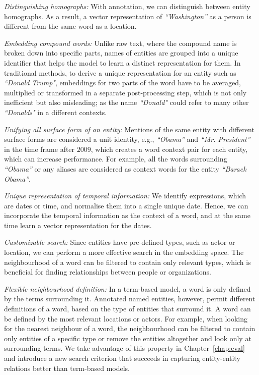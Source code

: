\begin{compactitem}
\item \emph{Distinguishing homographs:} With annotation, we can distinguish between entity homographs. As a result, a vector representation of \emph{``Washington''} as a person is different from the same word as a location. 
\item \emph{Embedding compound words:}  Unlike raw text, where the compound name is broken down into specific parts, names of entities are grouped into a unique identifier that helps the model to learn a distinct representation for them. In traditional methods, to derive a unique representation for an entity such as \emph{``Donald Trump"}, embeddings for two parts of the word have to be averaged, multiplied or transformed in a separate post-processing step, which is not only inefficient but also misleading; as the name \emph{``Donald"} could refer to many other \emph{``Donalds"} in a different contexts. 
\item \emph{Unifying all surface form of an entity:} Mentions of the same entity with different surface forms are considered a unit identity, e.g., \emph{``Obama''} and \emph{``Mr. President''} in the time frame after $2009$, which creates a word context pair for each entity, which can increase performance. For example, all the words surrounding \emph{``Obama''} or any aliases are considered as context words for the entity \emph{``Barack Obama''}. 
\item \emph{Unique representation of temporal information:} We identify expressions, which are dates or time, and normalise them into a single unique date. Hence, we can incorporate the temporal information as the context of a word, and at the same time learn a vector representation for the dates.
\item \emph{Customizable search:} Since entities have pre-defined types, such as actor or location, we can perform a more effective search in the embedding space. The neighbourhood of a word can be filtered to contain only relevant types, which is beneficial for finding relationships between people or organizations. 
\item \emph{Flexible neighbourhood definition:} In a term-based model, a word is only defined by the terms surrounding it.  Annotated named entities, however, permit different definitions of a word, based on the type of entities that surround it.
A word can be defined by the most relevant locations or actors. For example, when looking for the nearest neighbour of a word, the neighbourhood can be filtered to contain only entities of a specific type or remove the entities altogether and look only at surrounding terms. We take advantage of this property in Chapter~\ref{chap:eval} and introduce a new search criterion that succeeds in capturing entity-entity relations better than term-based models.\\
\end{compactitem}
